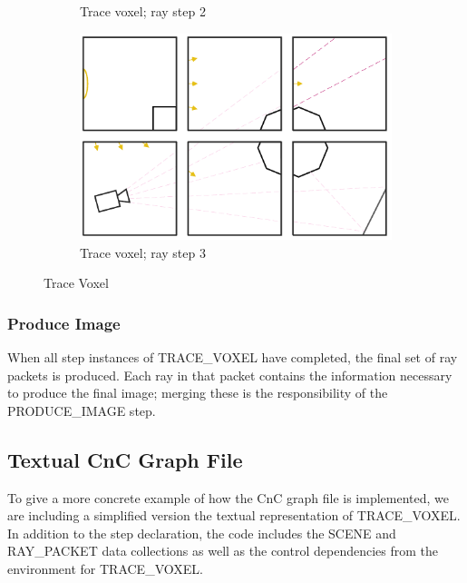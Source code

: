 \begin{figure}[!htb]
\begin{subfigure}{.49\columnwidth}
  \caption{Trace voxel; ray step 2}
\end{subfigure}
\begin{subfigure}{.49\columnwidth}
 \centering
  \includegraphics[width=.98\columnwidth]{drawings/Trace4.pdf}
  \caption{Trace voxel; ray step 3}
\end{subfigure}
\caption{Trace Voxel}
\label{fig:trace}
\end{figure}

\subsubsection{Produce Image}
When all step instances of TRACE\_VOXEL have completed, the final set of ray packets is produced.  Each ray in that packet contains the information necessary to produce the final image; merging these is the responsibility of the PRODUCE\_IMAGE step.  

\subsection{Textual CnC Graph File}
To give a more concrete example of how the CnC graph file is implemented, we are including a simplified version the textual representation of TRACE\_VOXEL.  In addition to the step declaration, the code includes the SCENE and RAY\_PACKET data collections as well as the control dependencies from the environment for TRACE\_VOXEL. \\


